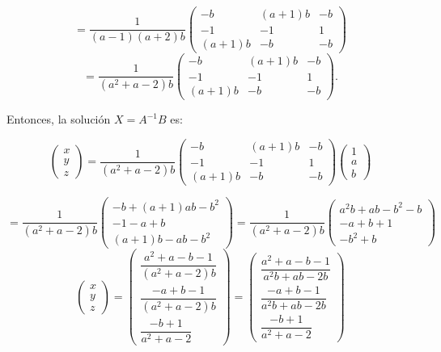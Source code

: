 \documentclass[a4paper,12pt]{article}
\begin{document}
\begin{ejercicio}[title=Ejercicio 31]
\begin{itemize}

\[
= \frac{1}{(a-1)(a+2)b}
\begin{pmatrix}
-b & (a+1)b & -b\\
-1 & -1 & 1\\
(a+1)b & -b & -b
\end{pmatrix}
\]
\[
= \frac{1}{(a^2 + a - 2)b}
\begin{pmatrix}
-b & (a+1)b & -b\\
-1 & -1 & 1\\
(a+1)b & -b & -b
\end{pmatrix}.
\]
\[\]

Entonces, la solución ${X} = {A}^{-1} {B}$ es:

\[
\begin{pmatrix}
x\\
y\\
z
\end{pmatrix}
= \frac{1}{(a^2+a-2)b}
\begin{pmatrix}
-b & (a+1)b & -b\\
-1 & -1 & 1\\
(a+1)b & -b & -b
\end{pmatrix}
\begin{pmatrix}
1\\
a\\
b
\end{pmatrix}
\]

\[
= \frac{1}{(a^2+a-2)b}
\begin{pmatrix}
-b + (a+1)ab -b^2\\
-1 -a +b\\
(a+1)b -ab -b^2
\end{pmatrix}
= \frac{1}{(a^2+a-2)b}
\begin{pmatrix}
a^2b+ab-b^2-b\\
-a +b + 1\\
-b^2 +b
\end{pmatrix}
\]
\[
\begin{pmatrix}
x\\
y\\
z
\end{pmatrix}
=
\begin{pmatrix}
\dfrac{a^2+a-b-1}{(a^2+a-2)b}\\[12pt]
\dfrac{-a+b-1}{(a^2+a-2)b}\\[12pt]
\dfrac{-b+1}{a^2+a-2}
\end{pmatrix}
=
\boxed{
\begin{pmatrix}
\dfrac{a^2+a-b-1}{a^2b+ab-2b}\\[12pt]
\dfrac{-a+b-1}{a^2b+ab-2b}\\[12pt]
\dfrac{-b+1}{a^2+a-2}
\end{pmatrix}}
\]


\end{itemize}
\end{ejercicio}
\end{document}
